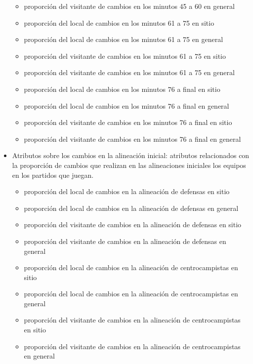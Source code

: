 \begin{itemize}
\begin{itemize}
              \item proporción del visitante de cambios en los minutos 45 a 60 en general
              \item proporción del local de cambios en los minutos 61 a 75 en sitio
              \item proporción del local de cambios en los minutos 61 a 75 en general
              \item proporción del visitante de cambios en los minutos 61 a 75 en sitio
              \item proporción del visitante de cambios en los minutos 61 a 75 en general
              \item proporción del local de cambios en los minutos 76 a final en sitio
              \item proporción del local de cambios en los minutos 76 a final en general
              \item proporción del visitante de cambios en los minutos 76 a final en sitio
              \item proporción del visitante de cambios en los minutos 76 a final en general
          \end{itemize}
    \item Atributos sobre los cambios en la alineación inicial: atributos relacionados con la proporción de cambios que realizan en las alineaciones iniciales los equipos en los partidos que juegan.
          \begin{itemize}
              \item proporción del local de cambios en la alineación de defensas en sitio
              \item proporción del local de cambios en la alineación de defensas en general
              \item proporción del visitante de cambios en la alineación de defensas en sitio
              \item proporción del visitante de cambios en la alineación de defensas en general
              \item proporción del local de cambios en la alineación de centrocampistas en sitio
              \item proporción del local de cambios en la alineación de centrocampistas en general
              \item proporción del visitante de cambios en la alineación de centrocampistas en sitio
              \item proporción del visitante de cambios en la alineación de centrocampistas en general

\end{itemize}
\end{itemize}

